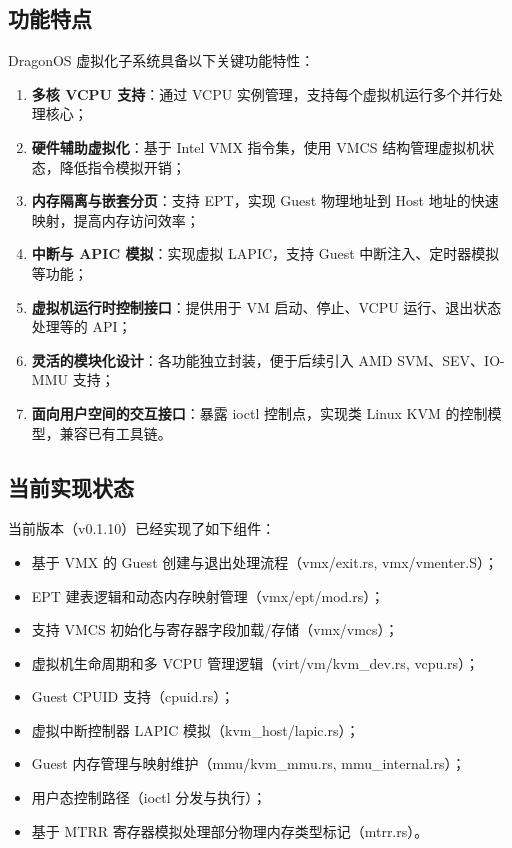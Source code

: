 \documentclass[analyze]{mancls}
\begin{document}
\subsection{功能特点}
DragonOS 虚拟化子系统具备以下关键功能特性：

\begin{enumerate}
    \item \textbf{多核 VCPU 支持}：通过 VCPU 实例管理，支持每个虚拟机运行多个并行处理核心；
    \item \textbf{硬件辅助虚拟化}：基于 Intel VMX 指令集，使用 VMCS 结构管理虚拟机状态，降低指令模拟开销；
    \item \textbf{内存隔离与嵌套分页}：支持 EPT，实现 Guest 物理地址到 Host 地址的快速映射，提高内存访问效率；
    \item \textbf{中断与 APIC 模拟}：实现虚拟 LAPIC，支持 Guest 中断注入、定时器模拟等功能；
    \item \textbf{虚拟机运行时控制接口}：提供用于 VM 启动、停止、VCPU 运行、退出状态处理等的 API；
    \item \textbf{灵活的模块化设计}：各功能独立封装，便于后续引入 AMD SVM、SEV、IO-MMU 支持；
    \item \textbf{面向用户空间的交互接口}：暴露 ioctl 控制点，实现类 Linux KVM 的控制模型，兼容已有工具链。
\end{enumerate}

\subsection{当前实现状态}
当前版本（v0.1.10）已经实现了如下组件：

\begin{itemize}
    \item 基于 VMX 的 Guest 创建与退出处理流程（vmx/exit.rs, vmx/vmenter.S）；
    \item EPT 建表逻辑和动态内存映射管理（vmx/ept/mod.rs）；
    \item 支持 VMCS 初始化与寄存器字段加载/存储（vmx/vmcs）；
    \item 虚拟机生命周期和多 VCPU 管理逻辑（virt/vm/kvm\_dev.rs, vcpu.rs）；
    \item Guest CPUID 支持（cpuid.rs）；
    \item 虚拟中断控制器 LAPIC 模拟（kvm\_host/lapic.rs）；
    \item Guest 内存管理与映射维护（mmu/kvm\_mmu.rs, mmu\_internal.rs）；
    \item 用户态控制路径（ioctl 分发与执行）；
    \item 基于 MTRR 寄存器模拟处理部分物理内存类型标记（mtrr.rs）。
\end{itemize}
\end{document}
